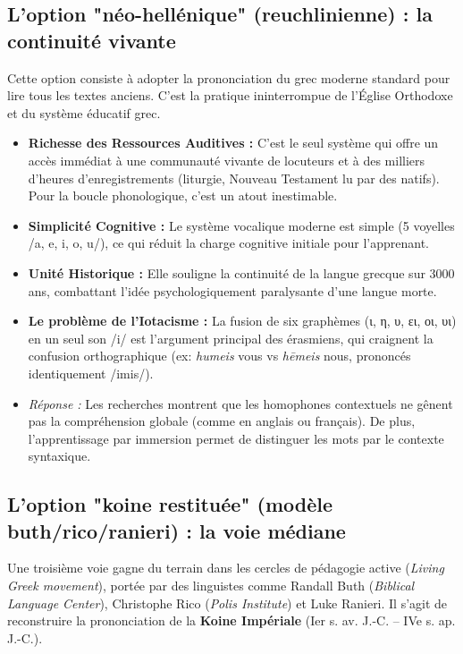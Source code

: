 \subsection{L'option "néo-hellénique" (reuchlinienne) : la continuité vivante}

Cette option consiste à adopter la prononciation du grec moderne standard pour lire tous les textes
anciens. C'est la pratique ininterrompue de l'Église Orthodoxe et du système éducatif
grec.\cite{ref6}

\begin{itemize}\item \textbf{Richesse des Ressources Auditives :} C'est le seul système qui offre un accès immédiat à une communauté vivante de locuteurs et à des milliers d'heures d'enregistrements (liturgie, Nouveau Testament lu par des natifs).\cite{ref29} Pour la boucle phonologique, c'est un atout inestimable.\item \textbf{Simplicité Cognitive :} Le système vocalique moderne est simple (5 voyelles /a, e, i, o, u/), ce qui réduit la charge cognitive initiale pour l'apprenant.\cite{ref6}\item \textbf{Unité Historique :} Elle souligne la continuité de la langue grecque sur 3000 ans, combattant l'idée psychologiquement paralysante d'une \og langue morte\fg{}.\cite{ref33}\end{itemize}\begin{itemize}\item \textbf{Le problème de l'Iotacisme :} La fusion de six graphèmes (ι, η, υ, ει, οι, υι) en un seul son /i/ est l'argument principal des érasmiens, qui craignent la confusion orthographique (ex: \textit{humeis} \og vous\fg{} vs \textit{hēmeis} \og nous\fg{}, prononcés identiquement /imis/).\cite{ref13}\item \textit{Réponse :} Les recherches montrent que les homophones contextuels ne gênent pas la compréhension globale (comme en anglais ou français). De plus, l'apprentissage par immersion permet de distinguer les mots par le contexte syntaxique.\cite{ref34}\end{itemize}

\subsection{L'option "koine restituée" (modèle buth/rico/ranieri) : la voie médiane}

Une \og troisième voie\fg{} gagne du terrain dans les cercles de pédagogie active (\textit{Living
Greek movement}), portée par des linguistes comme Randall Buth (\textit{Biblical Language Center}),
Christophe Rico (\textit{Polis Institute}) et Luke Ranieri.\cite{ref28} Il s'agit de reconstruire la
prononciation de la \textbf{Koine Impériale} (Ier s. av. J.-C. – IVe s. ap. J.-C.).

